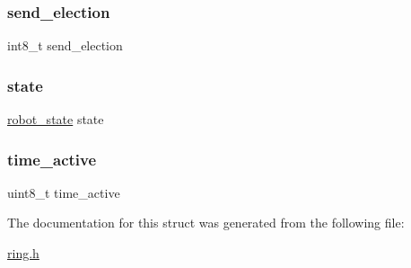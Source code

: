 \subsubsection{\texorpdfstring{send\+\_\+election}{send\_election}}
{\footnotesize\ttfamily int8\+\_\+t send\+\_\+election}

\mbox{\label{struct_u_s_e_r_d_a_t_a_aadbb2fcd5b6edab38e3aa5aca6d92439}} 
\subsubsection{\texorpdfstring{state}{state}}
{\footnotesize\ttfamily \hyperlink{ring_8h_a69b20b1a04c8e4cf3b72851b966259ec}{robot\+\_\+state} state}

\mbox{\label{struct_u_s_e_r_d_a_t_a_a517ee3480ceae26e41c5807b94d1b3f3}} 
\subsubsection{\texorpdfstring{time\+\_\+active}{time\_active}}
{\footnotesize\ttfamily uint8\+\_\+t time\+\_\+active}



The documentation for this struct was generated from the following file\+:\begin{DoxyCompactItemize}
\item 
\hyperlink{ring_8h}{ring.\+h}\end{DoxyCompactItemize}
